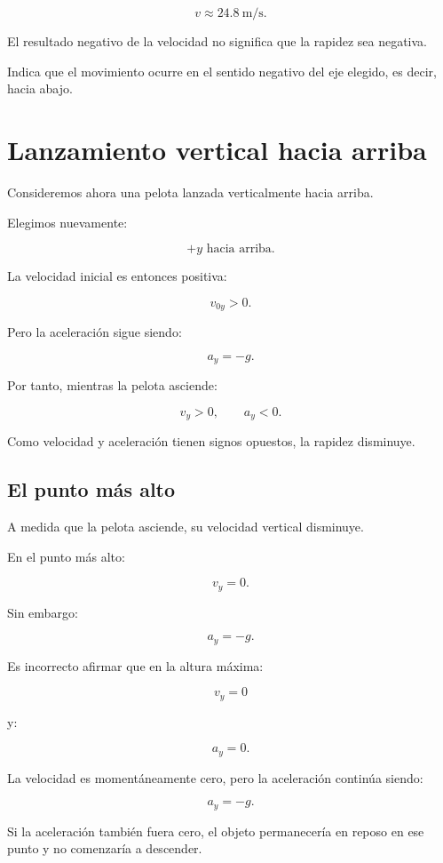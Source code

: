 \[ \boxed{v\approx\SI{24.8}{\meter\per\second}}. \]

\begin{interpretacion}
El resultado negativo de la velocidad no significa que la rapidez sea negativa.

Indica que el movimiento ocurre en el sentido negativo del eje elegido, es decir, hacia abajo.
\end{interpretacion}


\section{Lanzamiento vertical hacia arriba}

Consideremos ahora una pelota lanzada verticalmente hacia arriba.

Elegimos nuevamente:

\[ +y\text{ hacia arriba}. \]

La velocidad inicial es entonces positiva:

\[ v_{0y}>0. \]

Pero la aceleración sigue siendo:

\[ a_y=-g. \]

Por tanto, mientras la pelota asciende:

\[
v_y>0,
\qquad
a_y<0.
\]

Como velocidad y aceleración tienen signos opuestos, la rapidez disminuye.


\subsection{El punto más alto}

A medida que la pelota asciende, su velocidad vertical disminuye.

En el punto más alto:

\[ \boxed{v_y=0}. \]

Sin embargo:

\[ \boxed{a_y=-g}. \]

\begin{errorfrecuente}
Es incorrecto afirmar que en la altura máxima:

\[ v_y=0 \]

y:

\[ a_y=0. \]

La velocidad es momentáneamente cero, pero la aceleración continúa siendo:

\[ a_y=-g. \]

Si la aceleración también fuera cero, el objeto permanecería en reposo en ese punto y no comenzaría a descender.
\end{errorfrecuente}


